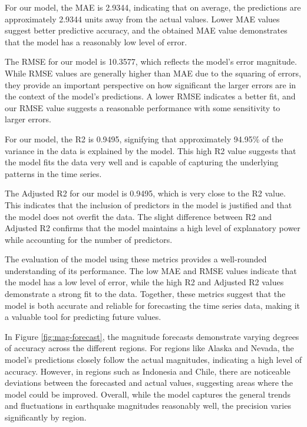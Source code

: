 For our model, the MAE is 2.9344, indicating that on average, the predictions are approximately 2.9344 units away from the actual values. Lower MAE values suggest better predictive accuracy, and the obtained MAE value demonstrates that the model has a reasonably low level of error.

The RMSE for our model is 10.3577, which reflects the model's error magnitude. While RMSE values are generally higher than MAE due to the squaring of errors, they provide an important perspective on how significant the larger errors are in the context of the model's predictions. A lower RMSE indicates a better fit, and our RMSE value suggests a reasonable performance with some sensitivity to larger errors.

For our model, the R2 is 0.9495, signifying that approximately 94.95\% of the variance in the data is explained by the model. This high R2 value suggests that the model fits the data very well and is capable of capturing the underlying patterns in the time series.

The Adjusted R2 for our model is 0.9495, which is very close to the R2 value. This indicates that the inclusion of predictors in the model is justified and that the model does not overfit the data. The slight difference between R2 and Adjusted R2 confirms that the model maintains a high level of explanatory power while accounting for the number of predictors.

The evaluation of the model using these metrics provides a well-rounded understanding of its performance. The low MAE and RMSE values indicate that the model has a low level of error, while the high R2 and Adjusted R2 values demonstrate a strong fit to the data. Together, these metrics suggest that the model is both accurate and reliable for forecasting the time series data, making it a valuable tool for predicting future values.


In Figure \ref{fig:mag-forecast}, the magnitude forecasts demonstrate varying degrees of accuracy across the different regions. For regions like Alaska and Nevada, the model's predictions closely follow the actual magnitudes, indicating a high level of accuracy. However, in regions such as Indonesia and Chile, there are noticeable deviations between the forecasted and actual values, suggesting areas where the model could be improved. Overall, while the model captures the general trends and fluctuations in earthquake magnitudes reasonably well, the precision varies significantly by region.

